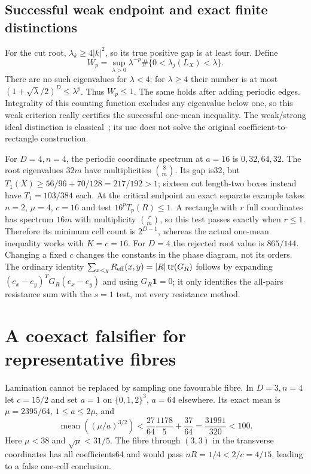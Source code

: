 \documentclass[11pt]{article}
\newcommand{\tr}{\operatorname{tr}}
\begin{document}
\subsection{Successful weak endpoint and exact finite distinctions}
For the cut root, $\lambda_k\ge4|k|^2$, so its true positive gap is at
least four. Define
\[
 W_p=\sup_{\lambda>0}\lambda^{-p}
          \#\{0<\lambda_j(L_X)<\lambda\}.
\]
There are no such eigenvalues for $\lambda<4$; for $\lambda\ge4$ their
number is at most $(1+\sqrt\lambda/2)^D\le\lambda^p$. Thus $W_p\le1$.
The same holds after adding periodic edges. Integrality of this counting
function excludes any eigenvalue below one, so this weak criterion really
certifies the successful one-mean inequality. The weak/strong ideal
distinction is classical~\cite{frank}; its use does not solve the original
coefficient-to-rectangle construction.

For $D=4,n=4$, the periodic coordinate spectrum at $a=16$ is
$0,32,64,32$. The root eigenvalues $32m$ have multiplicities
$\binom8m$. Its gap is32, but
$T_1(X)\ge56/96+70/128=217/192>1$; sixteen cut length-two boxes instead
have $T_1=103/384$ each. At the critical endpoint an exact separate
example takes $n=2$, $\mu=4$, $c=16$ and test $16^pT_p(R)\le1$.
A rectangle with $r$ full coordinates has spectrum $16m$ with multiplicity
$\binom rm$, so this test passes exactly when $r\le1$. Therefore its
minimum cell count is $2^{D-1}$, whereas the actual one-mean inequality
works with $K=c=16$. For $D=4$ the rejected root value is $865/144$.
Changing a fixed $c$ changes the constants in the phase diagram, not its
orders. The ordinary identity
$\sum_{x<y}R_{\rm eff}(x,y)=|R|\tr(G_R)$ follows by expanding
$(e_x-e_y)^TG_R(e_x-e_y)$ and using $G_R\mathbf1=0$; it only identifies
the all-pairs resistance sum with the $s=1$ test, not every resistance method.

\section{A coexact falsifier for representative fibres}
Lamination cannot be replaced by sampling one favourable fibre. In
$D=3,n=4$ let $c=15/2$ and set $a=1$ on $\{0,1,2\}^3$, $a=64$
elsewhere. Its exact mean is $\mu=2395/64$, $1\le a\le2\mu$, and
\[
 \operatorname{mean}((\mu/a)^{3/2})
 <\frac{27}{64}\frac{1178}{5}+\frac{37}{64}
 =\frac{31991}{320}<100.
\]
Here $\mu<38$ and $\sqrt\mu<31/5$. The fibre through $(3,3)$ in the
transverse coordinates has all coefficients64 and would pass
$nR=1/4<2/c=4/15$, leading to a false one-cell conclusion.
\end{document}
